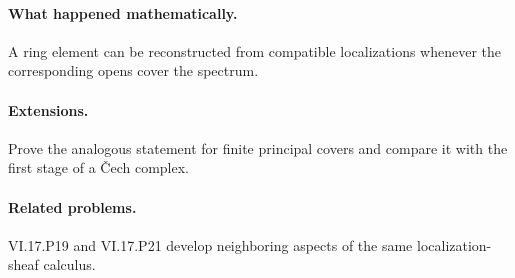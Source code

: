 \paragraph{What happened mathematically.}
A ring element can be reconstructed from compatible localizations whenever the corresponding opens cover the spectrum.

\paragraph{Extensions.}
Prove the analogous statement for finite principal covers and compare it with the first stage of a Čech complex.

\paragraph{Related problems.}
VI.17.P19 and VI.17.P21 develop neighboring aspects of the same localization-sheaf calculus.
\fi
